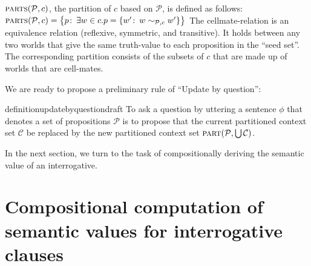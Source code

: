 \a $\textsc{parts}(\mathcal{P},c)$, the partition of $c$ based on $\mathcal{P}$,
is defined as
follows:\\
$\textsc{parts}(\mathcal{P},c) = \bigl\{p\co \exists w\in c. p = \{w'\co w \sim_{\mathcal{P},c} w'\}\bigr\}$
\xe
%
The cellmate-relation is an equivalence relation (reflexive, symmetric, and
transitive). It holds between any two worlds that give the same truth-value to
each proposition in the ``seed set''. The corresponding partition consists of
the subsets of $c$ that are made up of worlds that are cell-mates.

We are ready to propose a preliminary rule of ``Update by question'':

\begin{restatable}{definition}{updatebyquestiondraft}%
  \label{def:update-by-question-draft}%
  To ask a question by uttering a sentence $\phi$ that denotes a set of
  propositions $\mathcal{P}$ is to propose that the current partitioned context
  set $\mathcal{C}$ be replaced by the new partitioned context set
  $\textsc{part}(\mathcal{P},\bigcup \mathcal{C})$.
\end{restatable}

%
In the next section, we turn to the task of compositionally deriving the
semantic value of an interrogative.

\section{Compositional computation of semantic values for interrogative clauses}
\label{sec:compositional-interrogative}

